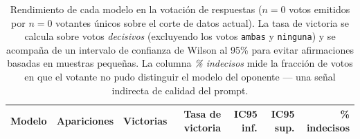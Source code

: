\begin{table}[ht]
    \centering
    \caption{Rendimiento de cada modelo en la votación de respuestas ($n=0$ votos emitidos por $n=0$ votantes únicos sobre el corte de datos actual). La tasa de victoria se calcula sobre votos \textit{decisivos} (excluyendo los votos \texttt{ambas} y \texttt{ninguna}) y se acompaña de un intervalo de confianza de Wilson al 95\% para evitar afirmaciones basadas en muestras pequeñas. La columna \textit{\% indecisos} mide la fracción de votos en que el votante no pudo distinguir el modelo del oponente — una señal indirecta de calidad del prompt.}
    \label{tab:votacion}
    \begin{tabular}{lrrrrrr}
    \toprule
    Modelo & Apariciones & Victorias & Tasa de victoria & IC95 inf. & IC95 sup. & \% indecisos \\
    \midrule
    
    \bottomrule
    \end{tabular}
\end{table}
